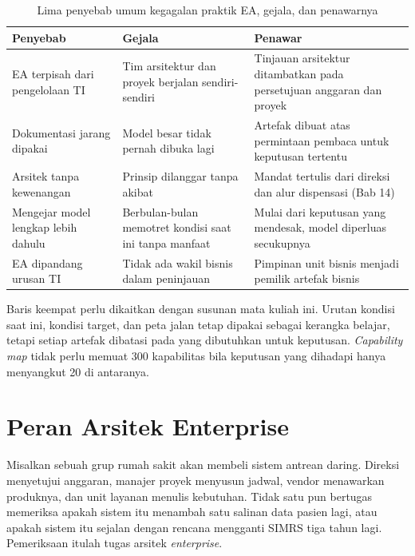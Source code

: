 \begin{table}[!htb]
  \centering
  \caption{Lima penyebab umum kegagalan praktik EA, gejala, dan penawarnya}
  \label{tab:ch01-gagal}
  \footnotesize
  \begin{tabularx}{\textwidth}{>{\raggedright\arraybackslash}p{2.9cm}
      >{\raggedright\arraybackslash}X >{\raggedright\arraybackslash}X}
    \hline
    \textbf{Penyebab} & \textbf{Gejala} & \textbf{Penawar} \\
    \hline
    EA terpisah dari pengelolaan TI \cite{c01-lohe2014} & Tim arsitektur dan proyek berjalan sendiri-sendiri & Tinjauan arsitektur ditambatkan pada persetujuan anggaran dan proyek \\
    \hline
    Dokumentasi jarang dipakai \cite{c01-lohe2014} & Model besar tidak pernah dibuka lagi & Artefak dibuat atas permintaan pembaca untuk keputusan tertentu \\
    \hline
    Arsitek tanpa kewenangan \cite{c01-lohe2014} & Prinsip dilanggar tanpa akibat & Mandat tertulis dari direksi dan alur dispensasi (Bab 14) \\
    \hline
    Mengejar model lengkap lebih dahulu \cite{kotusev2019} & Berbulan-bulan memotret kondisi saat ini tanpa manfaat & Mulai dari keputusan yang mendesak, model diperluas secukupnya \\
    \hline
    EA dipandang urusan TI \cite{leanix2025} & Tidak ada wakil bisnis dalam peninjauan & Pimpinan unit bisnis menjadi pemilik artefak bisnis \\
    \hline
  \end{tabularx}
\end{table}

Baris keempat perlu dikaitkan dengan susunan mata kuliah ini. Urutan kondisi
saat ini, kondisi target, dan peta jalan tetap dipakai sebagai kerangka
belajar, tetapi setiap artefak dibatasi pada yang dibutuhkan untuk keputusan.
\textit{Capability map} tidak perlu memuat 300 kapabilitas bila keputusan yang
dihadapi hanya menyangkut 20 di antaranya.

\section{Peran Arsitek Enterprise}

Misalkan sebuah grup rumah sakit akan membeli sistem antrean daring. Direksi
menyetujui anggaran, manajer proyek menyusun jadwal, vendor menawarkan
produknya, dan unit layanan menulis kebutuhan. Tidak satu pun bertugas
memeriksa apakah sistem itu menambah satu salinan data pasien lagi, atau
apakah sistem itu sejalan dengan rencana mengganti SIMRS tiga tahun lagi.
Pemeriksaan itulah tugas arsitek \textit{enterprise}.

